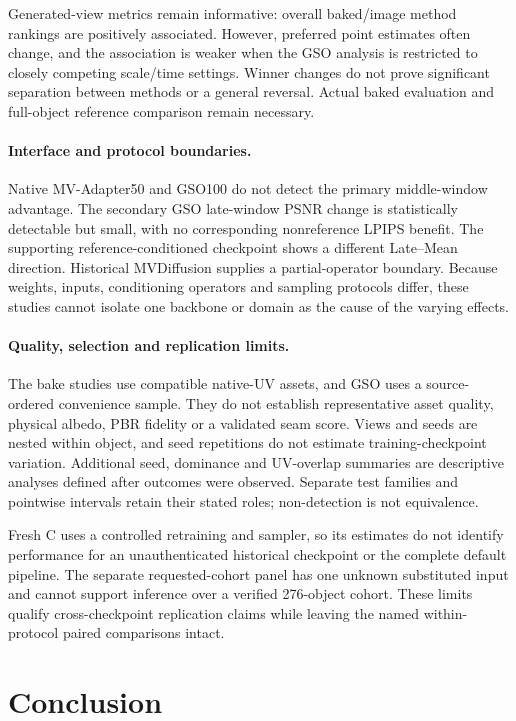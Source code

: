 \documentclass[times,twocolumn,final]{elsarticle}
\begin{document}
Generated-view metrics remain informative: overall baked/image method rankings are positively associated. However, preferred point estimates often change, and the association is weaker when the GSO analysis is restricted to closely competing scale/time settings. Winner changes do not prove significant separation between methods or a general reversal. Actual baked evaluation and full-object reference comparison remain necessary.

\paragraph{Interface and protocol boundaries.}
Native MV-Adapter50 and GSO100 do not detect the primary middle-window advantage. The secondary GSO late-window PSNR change is statistically detectable but small, with no corresponding nonreference LPIPS benefit. The supporting reference-conditioned checkpoint shows a different Late--Mean direction. Historical MVDiffusion supplies a partial-operator boundary. Because weights, inputs, conditioning operators and sampling protocols differ, these studies cannot isolate one backbone or domain as the cause of the varying effects.

\paragraph{Quality, selection and replication limits.}
The bake studies use compatible native-UV assets, and GSO uses a source-ordered convenience sample. They do not establish representative asset quality, physical albedo, PBR fidelity or a validated seam score. Views and seeds are nested within object, and seed repetitions do not estimate training-checkpoint variation. Additional seed, dominance and UV-overlap summaries are descriptive analyses defined after outcomes were observed. Separate test families and pointwise intervals retain their stated roles; non-detection is not equivalence.

Fresh C uses a controlled retraining and sampler, so its estimates do not identify performance for an unauthenticated historical checkpoint or the complete default pipeline. The separate requested-cohort panel has one unknown substituted input and cannot support inference over a verified 276-object cohort. These limits qualify cross-checkpoint replication claims while leaving the named within-protocol paired comparisons intact.

\section{Conclusion}
\label{sec:conclusion}
\end{document}
